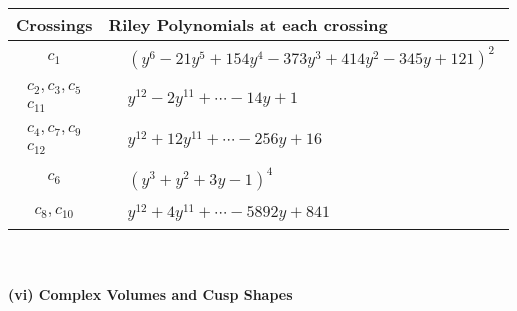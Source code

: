 \documentclass[1p]{elsarticle_modified}
\theoremstyle{definition}
\begin{document}
\begin{tabular}{m{50pt}|m{274pt}}
Crossings & \hspace{64pt}Riley Polynomials at each crossing \\
\hline $$\begin{aligned}c_{1}\end{aligned}$$&$\begin{aligned}
&(y^6-21 y^5+154 y^4-373 y^3+414 y^2-345 y+121)^2
\end{aligned}$\\
\hline $$\begin{aligned}c_{2},c_{3},c_{5}\\c_{11}\end{aligned}$$&$\begin{aligned}
&y^{12}-2 y^{11}+\cdots-14 y+1
\end{aligned}$\\
\hline $$\begin{aligned}c_{4},c_{7},c_{9}\\c_{12}\end{aligned}$$&$\begin{aligned}
&y^{12}+12 y^{11}+\cdots-256 y+16
\end{aligned}$\\
\hline $$\begin{aligned}c_{6}\end{aligned}$$&$\begin{aligned}
&(y^3+y^2+3 y-1)^4
\end{aligned}$\\
\hline $$\begin{aligned}c_{8},c_{10}\end{aligned}$$&$\begin{aligned}
&y^{12}+4 y^{11}+\cdots-5892 y+841
\end{aligned}$\\
\hline
\end{tabular}\\~\\
\newpage\flushleft \textbf{(vi) Complex Volumes and Cusp Shapes}
\end{document}
